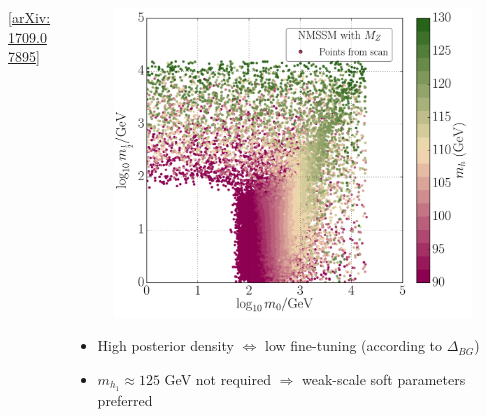 \documentclass[10pt,aspectratio=169]{beamer}
\begin{document}
\begin{frame}
\begin{columns}[t]
\begin{column}{0.7\textwidth}
      \vspace{-12pt}
      \begin{center}
        \tiny [\href{http://arxiv.org/abs/1709.07895}{arXiv:1709.07895}]
      \end{center}
    \end{column}
    \begin{column}{0.3\textwidth}
      \vspace{-25pt}
      \begin{figure}
        \centering
        \includegraphics[height=0.9\textwidth]{CNMSSM_mh}
      \end{figure}
      \vspace{-10pt}
      \begin{itemize} \itemsep1em
      \item {\color{blue} High posterior density $\Leftrightarrow$ low
        fine-tuning (according to $\Delta_{BG}$)}
      \item $m_{h_1} \approx 125$ GeV not required $\Rightarrow$
        weak-scale soft parameters preferred
      \end{itemize}
    \end{column}
  \end{columns}
\end{frame}
\end{document}
